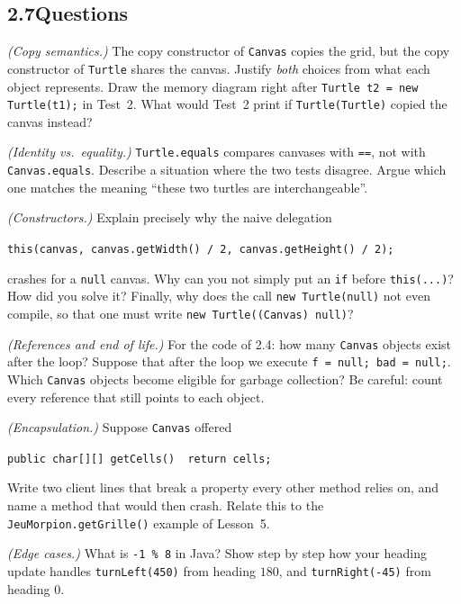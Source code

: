 \documentclass[11pt,a4paper]{article}
\newcommand{\code}[1]{\lstinline[basicstyle=\ttfamily\normalsize,basewidth=0.5em]{#1}}
\begin{document}
\subsection*{2.7\quad Questions}
\begin{questions}
  \item \emph{(Copy semantics.)} The copy constructor of \code{Canvas} copies the
        grid, but the copy constructor of \code{Turtle} shares the canvas.
        Justify \emph{both} choices from what each object represents. Draw the
        memory diagram right after \code{Turtle t2 = new Turtle(t1);} in Test~2.
        What would Test~2 print if \code{Turtle(Turtle)} copied the canvas instead?
  \item \emph{(Identity vs.\ equality.)} \code{Turtle.equals} compares canvases with
        \code{==}, not with \code{Canvas.equals}. Describe a situation where the two
        tests disagree. Argue which one matches the meaning ``these two turtles
        are interchangeable''.
  \item \emph{(Constructors.)} Explain precisely why the naive delegation
        \begin{center}\code{this(canvas, canvas.getWidth() / 2, canvas.getHeight() / 2);}\end{center}
        crashes for a \code{null} canvas. Why can you not simply put an \code{if}
        before \code{this(...)}? How did you solve it? Finally, why does the
        call \code{new Turtle(null)} not even compile, so that one must write
        \code{new Turtle((Canvas) null)}?
  \item \emph{(References and end of life.)} For the code of 2.4: how many
        \code{Canvas} objects exist after the loop? Suppose that after the loop
        we execute \code{f = null; bad = null;}. Which \code{Canvas} objects become
        eligible for garbage collection? Be careful: count every reference
        that still points to each object.
  \item \emph{(Encapsulation.)} Suppose \code{Canvas} offered
        \begin{center}\texttt{public char[][] getCells() \ return cells; }\end{center}
        Write two client
        lines that break a property every other method relies on, and name a
        method that would then crash. Relate this to the
        \code{JeuMorpion.getGrille()} example of Lesson~5.
  \item \emph{(Edge cases.)} What is \texttt{-1 \% 8} in Java? Show step by step how
        your heading update handles \code{turnLeft(450)} from heading $180$, and
        \code{turnRight(-45)} from heading $0$.
\end{questions}
\end{document}
